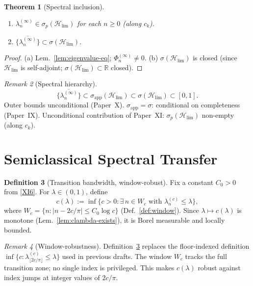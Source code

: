 \documentclass[12pt,a4paper]{amsart}
\newtheorem{theorem}{Theorem}[section]
\theoremstyle{definition}
\newtheorem{definition}[theorem]{Definition}
\theoremstyle{remark}
\newtheorem{remark}[theorem]{Remark}
\newcommand{\Hlim}{\mathcal{H}_{\lim}}
\newcommand{\sigapp}{\sigma_{\mathrm{app}}}
\begin{document}
\begin{theorem}[Spectral inclusion]
\label{thm:spectral-inclusion}
\begin{enumerate}[\rm(a)]
\item $\lambda_n^{(\infty)}\in\sigma_p(\Hlim)$
      for each $n\ge 0$ (along $c_k$).
\item $\overline{\{\lambda_n^{(\infty)}\}}
      \subset\sigma(\Hlim)$.
\end{enumerate}
\end{theorem}
\begin{proof}
(a) Lem.~\ref{lem:eigenvalue-eq};
$\Phi_n^{(\infty)}\ne 0$.
(b) $\sigma(\Hlim)$ is closed
(since $\Hlim$ is self-adjoint;
$\sigma(\Hlim)\subset\mathbb{R}$ closed).
\end{proof}

\begin{remark}[Spectral hierarchy]
\label{rem:sigma-app}
\[
  \overline{\{\lambda_n^{(\infty)}\}}
  \subset\sigapp(\Hlim)
  \subset\sigma(\Hlim)
  \subset[0,1].
\]
Outer bounds unconditional (Paper~X).
$\sigapp=\sigma$: conditional on completeness
(Paper~IX).
Unconditional contribution of Paper~XI:
$\sigma_p(\Hlim)$ non-empty (along $c_k$).
\end{remark}

\section{Semiclassical Spectral Transfer}
\label{sec:weyl}

\begin{definition}[Transition bandwidth, window-robust]
\label{def:clambda}
Fix a constant $C_0>0$ from \eqref{XI6}.
For $\lambda\in(0,1)$, define
\begin{equation}\label{eq:clambda}
  c(\lambda)
  := \inf\bigl\{c > 0 :
     \exists\, n\in W_c\text{ with }
     \lambda_n^{(c)}\le\lambda\bigr\},
\end{equation}
where $W_c = \{n : |n - 2c/\pi|\le C_0\log c\}$
(Def.~\ref{def:window}).
Since $\lambda\mapsto c(\lambda)$ is monotone
(Lem.~\ref{lem:clambda-exists}),
it is Borel measurable and locally bounded.
\end{definition}

\begin{remark}[Window-robustness]
\label{rem:clambda-robust}
Definition~\ref{def:clambda} replaces
the floor-indexed definition
$\inf\{c : \lambda_{\lfloor 2c/\pi\rfloor}^{(c)}
\le\lambda\}$
used in previous drafts.
The window $W_c$ tracks the full transition zone;
no single index is privileged.
This makes $c(\lambda)$ robust against
index jumps at integer values of $2c/\pi$.
\end{remark}
\end{document}
